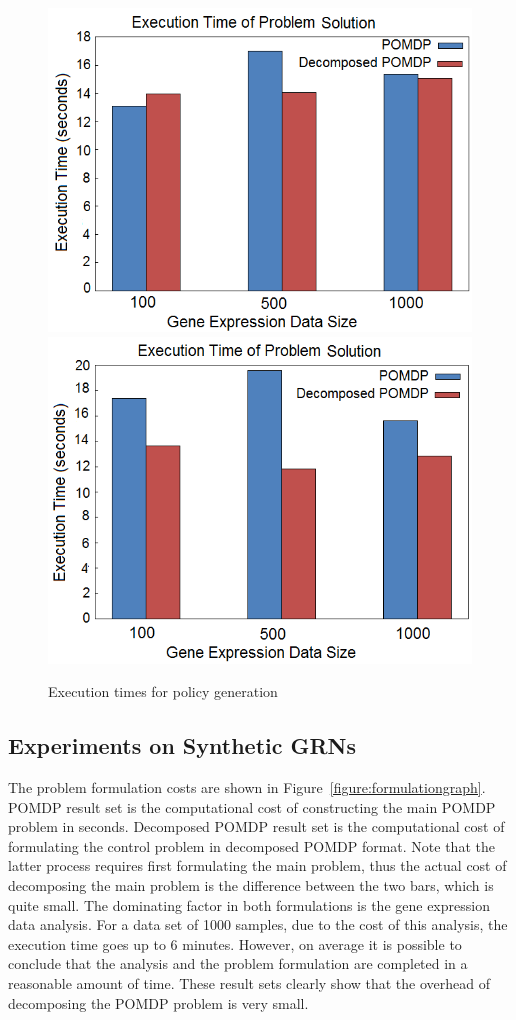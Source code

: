 \begin{figure}[h!]
\centering
\includegraphics[scale=0.5]{experiments/graph3.png}
\includegraphics[scale=0.5]{experiments/graph4.png}
\caption{Execution times for policy generation}\label{figure:policygeneration}
\end{figure}

\subsection{Experiments on Synthetic GRNs}
The problem formulation costs are shown in Figure~\ref{figure:formulationgraph}. POMDP result set is the
computational cost of constructing the main POMDP problem in seconds. Decomposed POMDP result set is the
computational cost of formulating the control problem in decomposed POMDP format. Note that the latter
process requires first formulating the main problem, thus the actual cost of decomposing the main problem is
the difference between the two bars, which is quite small. The dominating factor in both formulations is the
gene expression data analysis. For a data set of 1000 samples, due to the cost of this analysis, the
execution time goes up to 6 minutes. However, on average it is possible to conclude that the analysis and the
problem formulation are completed in a reasonable amount of time. These result sets clearly show that the
overhead of decomposing the POMDP problem is very small.

